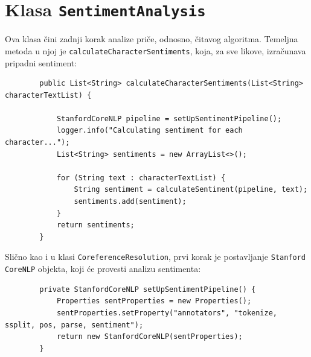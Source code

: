\documentclass[a4paper,twoside,12pt]{memoir} %
\begin{document}
	\section{Klasa \texttt{SentimentAnalysis}}

		Ova klasa čini zadnji korak analize priče, odnosno, čitavog algoritma. Temeljna metoda u njoj je  \texttt{calculateCharacterSentiments}, koja, za sve likove, izračunava pripadni sentiment:

		\begin{lstlisting}
		public List<String> calculateCharacterSentiments(List<String> characterTextList) {

			StanfordCoreNLP pipeline = setUpSentimentPipeline();
			logger.info("Calculating sentiment for each character...");
			List<String> sentiments = new ArrayList<>();

			for (String text : characterTextList) {
				String sentiment = calculateSentiment(pipeline, text);
				sentiments.add(sentiment);
			}
			return sentiments;
		}
		\end{lstlisting}

		Slično kao i u klasi \texttt{CoreferenceResolution}, prvi korak je postavljanje \texttt{Stan\-ford CoreNLP} objekta, koji će provesti analizu sentimenta:

		\begin{lstlisting}
		private StanfordCoreNLP setUpSentimentPipeline() {
			Properties sentProperties = new Properties();
			sentProperties.setProperty("annotators", "tokenize, ssplit, pos, parse, sentiment");
			return new StanfordCoreNLP(sentProperties);
		}
		\end{lstlisting}
\end{document}
